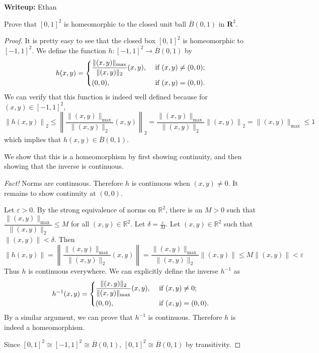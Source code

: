 \documentclass{article}
\newcommand{\R}{\mathbf{R}}
\newcommand{\cl}[1]{\overline{#1}}
\theoremstyle{plain} %
\numberwithin{thm}{section} %
\theoremstyle{definition}
\begin{document}
    \noindent\textbf{Writeup:} Ethan

    Prove that $[0,1]^2$ is homeomorphic to the closed unit ball $\cl{B}(0,1)$ in $\R^2$.

    \begin{proof}
        It is pretty easy to see that the closed box \([0,1]^2\) is homeomorphic to \([-1,1]^2\). We define the function \(h:[-1,1]^2 \to \cl{B}(0,1)\) by
        \[
            h(x,y)=\begin{dcases}
                \frac{\|(x,y)\| _{\max}}{\|(x,y)\| _2}(x, y), &\text{ if } (x,y) \neq (0,0) ;\\
                (0,0), &\text{ if } (x,y)=(0,0).
            \end{dcases}
        \]
        We can verify that this function is indeed well defined because for \((x,y) \in [-1,1]^2\),
        \[
            \left\lVert h(x,y) \right\rVert _2 \leq \left\lVert \frac{\|(x,y)\| _{\max}}{\|(x,y)\| _2}(x, y) \right\rVert _2 = \frac{\|(x,y)\| _{\max}}{\|(x,y)\| _2} \left\lVert (x,y) \right\rVert _2 = \|(x,y)\| _{\max} \leq 1
        \]
        which implies that \(h(x,y) \in \cl{B}(0,1)\).

        We show that this is a homeomorphism by first showing continuity, and then showing that the inverse is continuous.

        \textit{Fact!} Norms are continuous. Therefore \(h\) is continuous when \((x,y) \neq 0\). It remains to show continuity at \((0,0)\).

        Let \(\varepsilon > 0\). By the strong equivalence of norms on \(\mathbb{R}^2\), there is an \(M >0\) such that \(\dfrac{\|(x,y)\| _{\max}}{\|(x,y)\| _2} \leq M\) for all \((x,y) \in \mathbb{R}^2\). Let \(\delta = \frac{\varepsilon}{M}\). Let \((x,y) \in \mathbb{R}^2\) such that \(\|(x,y)\| < \delta\).
        Then
        \[
            \left\lVert h(x,y) \right\rVert = \left\lVert \frac{\|(x,y)\| _{\max}}{\|(x,y)\| _2}(x, y) \right\rVert = \frac{\|(x,y)\| _{\max}}{\|(x,y)\| _2} \left\lVert (x,y) \right\rVert \leq M \left\lVert (x,y) \right\rVert < \varepsilon
        \]
        Thus \(h\) is continuous everywhere. We can explicitly define the inverse \(h^{-1}\) as
        \[
            h^{-1} (x,y) = \begin{dcases}
                \frac{\|(x,y)\| _2}{\|(x,y)\| _{\max}} (x,y), &\text{ if } (x,y) \neq 0 ;\\
                (0,0), &\text{ if } (x,y) = (0,0).
            \end{dcases}
        \]
        By a similar argument, we can prove that \(h^{-1}\) is continuous. Therefore \(h\) is indeed a homeomorphism.

        Since \([0,1]^2 \cong [-1,1]^2 \cong \cl{B}(0,1)\), \([0,1]^2 \cong \cl{B}(0,1)\) by transitivity.
        
    \end{proof}
\end{document}
